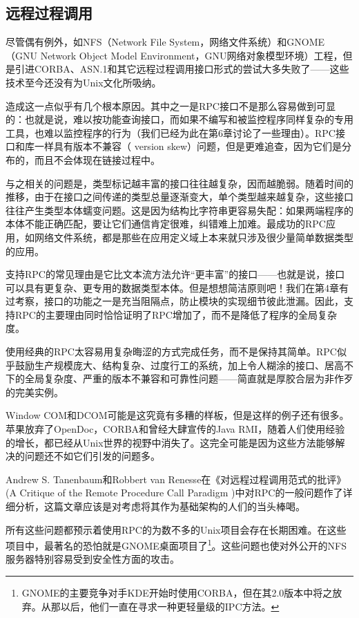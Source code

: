 \documentclass[12pt,oneside]{book}
\begin{document}
\begin{common-format}
\subsection{远程过程调用}
尽管偶有例外，如NFS（Network File System，网络文件系统）和GNOME （GNU Network Object Model Environment，GNU网络对象模型环境）工程，但是引进CORBA、ASN.1和其它远程过程调用接口形式的尝试大多失败了——这些技术至今还没有为Unix文化所吸纳。

造成这一点似乎有几个根本原因。其中之一是RPC接口不是那么容易做到可显的：也就是说，难以按功能查询接口，而如果不编写和被监控程序同样复杂的专用工具，也难以监控程序的行为（我们已经为此在第6章讨论了一些理由）。RPC接口和库一样具有版本不兼容（ version skew）问题，但是更难追查，因为它们是分布的，而且不会体现在链接过程中。

与之相关的问题是，类型标记越丰富的接口往往越复杂，因而越脆弱。随着时间的推移，由于在接口之间传递的类型总量逐渐变大，单个类型越来越复杂，这些接口往往产生类型本体蠕变问题。这是因为结构比字符串更容易失配：如果两端程序的本体不能正确匹配，要让它们通信肯定很难，纠错难上加难。最成功的RPC应用，如网络文件系统，都是那些在应用定义域上本来就只涉及很少量简单数据类型的应用。

支持RPC的常见理由是它比文本流方法允许“更丰富”的接口——也就是说，接口可以具有更复杂、更专用的数据类型本体。但是想想简洁原则吧！我们在第4章有过考察，接口的功能之一是充当阻隔点，防止模块的实现细节彼此泄漏。因此，支持RPC的主要理由同时恰恰证明了RPC增加了，而不是降低了程序的全局复杂度。

使用经典的RPC太容易用复杂晦涩的方式完成任务，而不是保持其简单。RPC似乎鼓励生产规模庞大、结构复杂、过度行工的系统，加上令人糊涂的接口、居高不下的全局复杂度、严重的版本不兼容和可靠性问题——简直就是厚胶合层为非作歹的完美实例。

Window COM和DCOM可能是这究竟有多糟的样板，但是这样的例子还有很多。苹果放弃了OpenDoc，CORBA和曾经大肆宣传的Java RMI，随着人们使用经验的增长，都已经从Unix世界的视野中消失了。这完全可能是因为这些方法能够解决的问题还不如它们引发的问题多。

Andrew S. Tanenbaum和Robbert van Renesse在《对远程过程调用范式的批评》(A Critique of the Remote Procedure Call Paradigm \cite{Tanenbaum-VanRenesse})中对RPC的一般问题作了详细分析，这篇文章应该是对考虑将其作为基础架构的人们的当头棒喝。

所有这些问题都预示着使用RPC的为数不多的Unix项目会存在长期困难。在这些项目中，最著名的恐怕就是GNOME桌面项目了\footnote{GNOME的主要竞争对手KDE开始时使用CORBA，但在其2.0版本中将之放弃。从那以后，他们一直在寻求一种更轻量级的IPC方法。}。这些问题也使对外公开的NFS服务器特别容易受到安全性方面的攻击。


\end{common-format}
\end{document}
